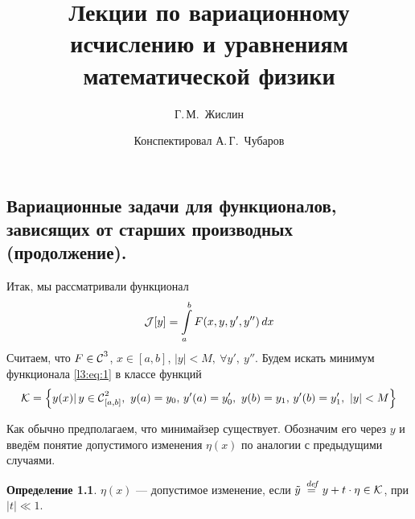 \documentclass[12pt,a4paper,openany,fleqn]{book}
\newcommand {\defeq}{\stackrel{\hspace{0.09 cm}de\!f}{=}}
\newcommand {\eqdef}{\defeq}
\newcommand{\Cf}{\ensuremath{\mathcal{C}}}
\newcommand{\J}{\ensuremath{\mathcal{J}}}
\newcommand{\mc}[1]{\ensuremath{\mathcal{#1}}}
\newcommand{\Cfn}[2][]{\ensuremath{\Cf{\mathstrut}^{#2}_{#1}}}
\newcommand{\K}{\mc{K}}
\theoremstyle{definition}
\newtheorem{_def}{Определение}[section]
\begin{document}
	\author{Г.\,М.~Жислин}
	\title{Лекции по вариационному исчислению и уравнениям математической физики}
	\date{Конспектировал А.\,Г.~Чубаров}
	
	
	
	\maketitle
	
	
	\renewcommand{\thepart}{\Asbuk{part}}
	\renewcommand{\thechapter}{\arabic{chapter}}
	\renewcommand{\thesection}{\arabic{section}}
	\renewcommand{\thesubsection}{\Roman{subsection}}
	\renewcommand{\thefootnote}{\roman{footnote}}
	\renewcommand{\phi}{\varphi}
	
	\setcounter{chapter}{2}
	\chapter{}
	\label{lecture3}
	\section[Задачи для функционалов, зависящих от старших производных (продолжение).]{Вариационные задачи для функционалов, зависящих от старших производных (продолжение).}
	\label{lecture3section1}
	
	Итак, мы рассматривали функционал 
	\begin{equation}
		\label{l3:eq:1}
		\hfill\J[y]=\int\limits_a^b F(x,y,y',y'')\,dx\hfill
	\end{equation}
	Считаем, что $F\in\Cfn{3}$, $x\in[a,b]$, $|y|<M,\ \forall y',\ y''$. 
	Будем искать минимум функционала \eqref{l3:eq:1} в классе функций
	\begin{equation*}
		\hfill\K=\left\{y(x)|\,y\in\Cfn[{[a,b]}]{2},\ y(a)=y_0,\,y'(a)=y'_0,\ y(b)=y_1,\,y'(b)=y'_1,\ |y|<M\right\}\hfill
	\end{equation*}
	
	Как обычно предполагаем, что минимайзер существует. Обозначим его через $y$ и введём понятие допустимого изменения $\eta(x)$ по аналогии с предыдущими случаями.
	\begin{_def}
		$\eta(x)$ --- допустимое изменение, если $\tilde{y}\eqdef y+t\cdot\eta\in\K$, при $|t|\ll1$.
	\end{_def} 
\end{document}
